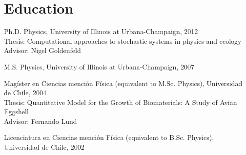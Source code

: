 \documentclass[letterpaper]{article}
\renewenvironment{itemize}{
  \begin{list}{}{
    \setlength{\leftmargin}{1.5em}
  }
}{
  \end{list}
}
\begin{document}

\section*{Education}

\begin{itemize}
  \item Ph.D. Physics, University of Illinois at Urbana-Champaign, 2012 \\
  Thesis: Computational approaches to stochastic systems in physics and ecology \\
  Advisor: Nigel Goldenfeld

  \item M.S. Physics, University of Illinois at Urbana-Champaign, 2007

  \item Magíster en Ciencias mención Física (equivalent to M.Sc. Physics),
  Universidad de Chile, 2004\\ Thesis: Quantitative Model for the Growth of Biomaterials: A Study of Avian
  Eggshell \\
  Advisor: Fernando Lund

  \item Licenciatura en Ciencias mención Física (equivalent to B.Sc. Physics),
  Universidad de Chile, 2002
\end{itemize}
\end{document}
